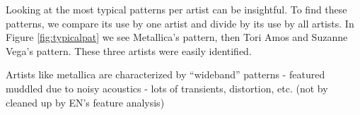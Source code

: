 \documentclass{article}
\begin{document}
Looking at the most typical patterns per artist can be insightful.
To find these patterns, we compare its use by one artist and divide
by its use by all artists. In Figure \ref{fig:typicalpat} we see 
Metallica's pattern, then Tori Amos and
Suzanne Vega's pattern. These three artists were easily identified.

Artists like metallica are characterized by ``wideband'' patterns -
featured muddled due to noisy acoustics - lots of transients,
distortion, etc.  (not by cleaned up by EN's feature analysis)

\end{document}
